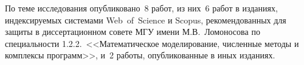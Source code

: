 {\begin{refsection}
    По теме исследования опубликовано~8 работ, из них~6 работ в изданиях, индексируемых системами Web~of~Science и Scopus, рекомендованных для защиты в диссертационном совете МГУ имени М.В.~Ломоносова по специальности 1.2.2.~<<Математическое моделирование, численные методы и комплексы программ>>, и~2 работы, опубликованные в иных изданиях.
    	
        
        
    \end{refsection}%
    \begin{refsection}


\end{refsection}}
